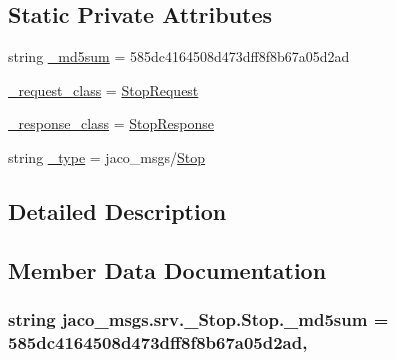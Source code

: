 \subsection*{Static Private Attributes}
\begin{DoxyCompactItemize}
\item 
string \hyperlink{classjaco__msgs_1_1srv_1_1__Stop_1_1Stop_ad94a69c926439b9495371bc22c1556ae}{\+\_\+md5sum} = \textquotesingle{}585dc4164508d473dff8f8b67a05d2ad\textquotesingle{}
\item 
\hyperlink{classjaco__msgs_1_1srv_1_1__Stop_1_1Stop_a758bf662de4bbb2dfc37b20aa47f6513}{\+\_\+request\+\_\+class} = \hyperlink{classjaco__msgs_1_1srv_1_1__Stop_1_1StopRequest}{Stop\+Request}
\item 
\hyperlink{classjaco__msgs_1_1srv_1_1__Stop_1_1Stop_a899c3301343e452dd9de125a57a64946}{\+\_\+response\+\_\+class} = \hyperlink{classjaco__msgs_1_1srv_1_1__Stop_1_1StopResponse}{Stop\+Response}
\item 
string \hyperlink{classjaco__msgs_1_1srv_1_1__Stop_1_1Stop_a653645ddd44e8f91e4e6eadd93640916}{\+\_\+type} = \textquotesingle{}jaco\+\_\+msgs/\hyperlink{classjaco__msgs_1_1srv_1_1__Stop_1_1Stop}{Stop}\textquotesingle{}
\end{DoxyCompactItemize}


\subsection{Detailed Description}


\subsection{Member Data Documentation}
\subsubsection[{\texorpdfstring{\+\_\+md5sum}{_md5sum}}]{\setlength{\rightskip}{0pt plus 5cm}string jaco\+\_\+msgs.\+srv.\+\_\+\+Stop.\+Stop.\+\_\+md5sum = \textquotesingle{}585dc4164508d473dff8f8b67a05d2ad\textquotesingle{}\hspace{0.3cm}{\ttfamily [static]}, {\ttfamily [private]}}\hypertarget{classjaco__msgs_1_1srv_1_1__Stop_1_1Stop_ad94a69c926439b9495371bc22c1556ae}{}\label{classjaco__msgs_1_1srv_1_1__Stop_1_1Stop_ad94a69c926439b9495371bc22c1556ae}
